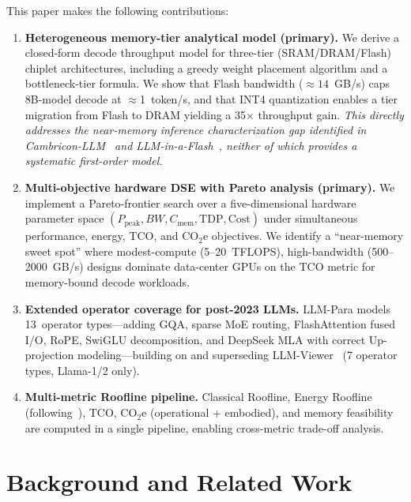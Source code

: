 \documentclass[journal]{IEEEtran}
\begin{document}
This paper makes the following contributions:

\begin{enumerate}
\item \textbf{Heterogeneous memory-tier analytical model (primary).}
  We derive a closed-form decode throughput model for three-tier
  (SRAM/DRAM/Flash) chiplet architectures, including a greedy weight
  placement algorithm and a bottleneck-tier formula. We show that Flash
  bandwidth (${\approx}14$~GB/s) caps 8B-model decode at $\approx$1~token/s,
  and that INT4 quantization enables a tier migration from Flash to DRAM
  yielding a 35$\times$ throughput gain.
  \emph{This directly addresses the near-memory inference characterization
  gap identified in Cambricon-LLM~\cite{cambriconllm} and
  LLM-in-a-Flash~\cite{llminaflash}, neither of which provides a
  systematic first-order model.}

\item \textbf{Multi-objective hardware DSE with Pareto analysis (primary).}
  We implement a Pareto-frontier search over a five-dimensional hardware
  parameter space $(P_\text{peak}, BW, C_\text{mem}, \text{TDP},
  \text{Cost})$ under simultaneous performance, energy, TCO, and CO$_2$e
  objectives. We identify a ``near-memory sweet spot'' where modest-compute
  (5--20~TFLOPS), high-bandwidth (500--2000~GB/s) designs dominate
  data-center GPUs on the TCO metric for memory-bound decode workloads.

\item \textbf{Extended operator coverage for post-2023 LLMs.}
  LLM-Para models 13~operator types---adding GQA, sparse MoE routing,
  FlashAttention fused I/O, RoPE, SwiGLU decomposition, and DeepSeek
  MLA with correct Up-projection modeling---building on and superseding
  LLM-Viewer~\cite{llmviewer} (7 operator types, Llama-1/2 only).

\item \textbf{Multi-metric Roofline pipeline.}
  Classical Roofline, Energy Roofline (following~\cite{energyroofline}),
  TCO, CO$_2$e (operational + embodied), and memory feasibility are
  computed in a single pipeline, enabling cross-metric trade-off analysis.
\end{enumerate}

\section{Background and Related Work}
\label{sec:background}
\end{document}
